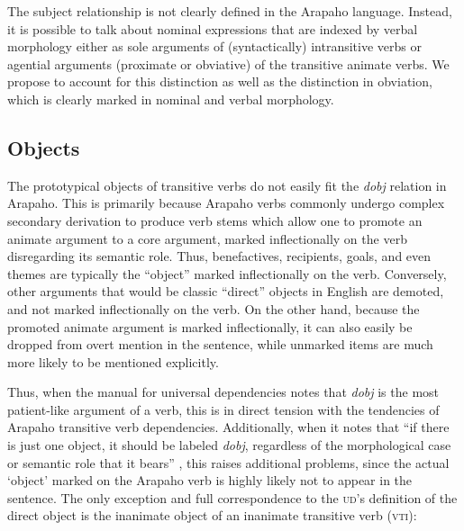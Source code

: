 \documentclass[11pt]{article}
\begin{document}
The subject relationship is not clearly defined in the Arapaho language. Instead, it is possible to talk about nominal expressions that are indexed by verbal morphology either as sole arguments of (syntactically) intransitive verbs or agential arguments (proximate or obviative) of the transitive animate verbs. We propose to account for this distinction as well as the distinction in obviation, which is clearly marked in nominal and verbal morphology.
\subsection{Objects}
The prototypical objects of transitive verbs do not easily fit the \textit{dobj} relation in Arapaho. This is primarily because Arapaho verbs commonly undergo complex secondary derivation to produce verb stems which allow one to promote an animate argument to a core argument, marked inflectionally on the verb disregarding its semantic role. Thus, benefactives, recipients, goals, and even themes are typically the ``object'' marked inflectionally on the verb. Conversely, other arguments that would be classic ``direct'' objects in English are demoted, and not marked inflectionally on the verb. On the other hand, because the promoted animate argument is marked inflectionally, it can also easily be dropped from overt mention in the sentence, while unmarked items are much more likely to be mentioned explicitly.

Thus, when the manual for universal dependencies  notes that \textit{dobj} is the most patient-like argument of a verb, this is in direct tension with the tendencies of Arapaho transitive verb dependencies. Additionally, when it notes that ``if there is just one object, it should be labeled \textit{dobj}, regardless of the morphological case or semantic role that it bears'' \cite{ud2014}, this raises additional problems, since the actual `object' marked on the Arapaho verb is highly likely not to appear in the sentence. The only exception and full correspondence to the \textsc{ud}'s definition of the direct object is the inanimate object of an inanimate transitive verb (\textsc{vti}):
\end{document}
